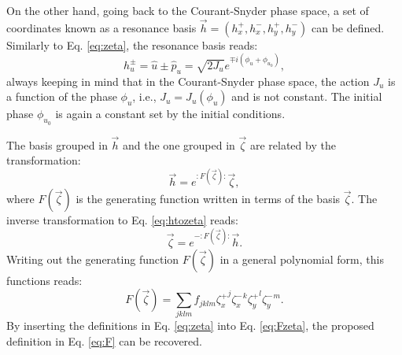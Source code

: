 On the other hand, going back to the Courant-Snyder phase space, a set of coordinates known as a resonance basis $\vec{h} = \left( h_x^+ , h_x^-, h_y^+, h_y^-\right)$ can be defined. Similarly to Eq. \ref{eq:zeta}, the resonance basis reads:
\begin{equation}
    \label{eq:hbasis}
    h_u^{\pm}=\hat{u}\pm \hat{p}_u=\sqrt{2J_u}e^{\mp i\left( \phi_u + \phi_{u_0}\right)},
\end{equation}
always keeping in mind that in the Courant-Snyder phase space, the action $J_u$ is a function of the phase $\phi_u$, i.e., $J_u = J_u(\phi_u)$ and is not constant. The initial phase $\phi_{u_0}$ is again a constant set by the initial conditions. 

The basis grouped in $\vec{h}$ and the one grouped in $\vec{\zeta}$ are related by the transformation:
\begin{equation}
    \label{eq:htozeta}
    \vec{h}=e^{:F \left(\vec{\zeta}\right):}\vec{\zeta},
\end{equation}
where $F(\vec{\zeta})$ is the generating function written in terms of the basis $\vec{\zeta}$. The inverse transformation to Eq. \ref{eq:htozeta} reads:
\begin{equation}
    \label{eq:zetatoh}
    \vec{\zeta}=e^{-:F\left( \vec{\zeta} \right):}\vec{h}.
\end{equation}
Writing out the generating function $F(\vec{\zeta})$ in a general polynomial form, this functions reads:
\begin{equation}
    \label{eq:Fzeta}
    F\left( \vec{\zeta} \right)=\sum_{jklm} f_{jklm} {\zeta_x^{+}}^{j} {\zeta_x^{-}}^k {\zeta_y^{+}}^l {\zeta_y^{-}}^m.
\end{equation}
By inserting the definitions in Eq. \ref{eq:zeta} into Eq. \ref{eq:Fzeta}, the proposed definition in Eq. \ref{eq:F} can be recovered.

